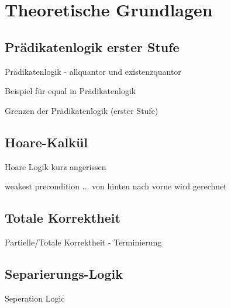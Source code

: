 ﻿
\chapter{Theoretische Grundlagen}

\section{Prädikatenlogik erster Stufe}

Prädikatenlogik - allquantor und existenzquantor


Beispiel für equal in Prädikatenlogik


Grenzen der Prädikatenlogik (erster Stufe)

\section{Hoare-Kalkül}

Hoare Logik kurz angerissen

weakest precondition ... von hinten nach vorne wird gerechnet


\section{Totale Korrektheit}

Partielle/Totale Korrektheit - Terminierung

\section{Separierungs-Logik}
\label{sec:theorie:seperation-logic}

Seperation Logic
